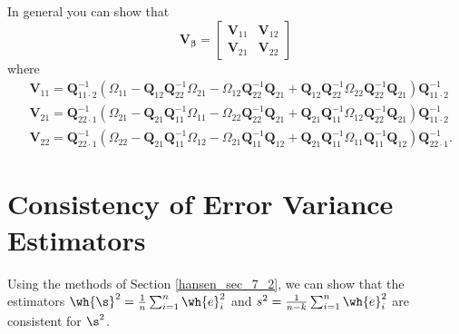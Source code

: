 In general you can show that 
\begin{equation}
    \label{hansen_eq_7_13}
    \boldsymbol{V}_{\boldsymbol{\beta}}=\left[\begin{array}{ll}
    \boldsymbol{V}_{11} & \boldsymbol{V}_{12} \\
    \boldsymbol{V}_{21} & \boldsymbol{V}_{22}
    \end{array}\right]
\end{equation}
where 
\begin{align}
    & \boldsymbol{V}_{11}=\boldsymbol{Q}_{11 \cdot 2}^{-1}\left(\Omega_{11}-\boldsymbol{Q}_{12} \boldsymbol{Q}_{22}^{-1} \Omega_{21}-\Omega_{12} \boldsymbol{Q}_{22}^{-1} \boldsymbol{Q}_{21}+\boldsymbol{Q}_{12} \boldsymbol{Q}_{22}^{-1} \Omega_{22} \boldsymbol{Q}_{22}^{-1} \boldsymbol{Q}_{21}\right) \boldsymbol{Q}_{11 \cdot 2}^{-1} \label{hansen_eq_7_14} \\
    & \boldsymbol{V}_{21}=\boldsymbol{Q}_{22 \cdot 1}^{-1}\left(\Omega_{21}-\boldsymbol{Q}_{21} \boldsymbol{Q}_{11}^{-1} \Omega_{11}-\Omega_{22} \boldsymbol{Q}_{22}^{-1} \boldsymbol{Q}_{21}+\boldsymbol{Q}_{21} \boldsymbol{Q}_{11}^{-1} \Omega_{12} \boldsymbol{Q}_{22}^{-1} \boldsymbol{Q}_{21}\right) \boldsymbol{Q}_{11 \cdot 2}^{-1} \label{hansen_eq_7_15} \\
    & \boldsymbol{V}_{22}=\boldsymbol{Q}_{22 \cdot 1}^{-1}\left(\Omega_{22}-\boldsymbol{Q}_{21} \boldsymbol{Q}_{11}^{-1} \Omega_{12}-\Omega_{21} \boldsymbol{Q}_{11}^{-1} \boldsymbol{Q}_{12}+\boldsymbol{Q}_{21} \boldsymbol{Q}_{11}^{-1} \Omega_{11} \boldsymbol{Q}_{11}^{-1} \boldsymbol{Q}_{12}\right) \boldsymbol{Q}_{22 \cdot 1}^{-1} \label{hansen_eq_7_16}.
\end{align}

\section{Consistency of Error Variance Estimators}
\setcounter{equation}{16}

Using the methods of Section \ref{hansen_sec_7_2}, we can show that the estimators $\wh{\s}^2 = \frac{1}{n}\sum_{i=1}^{n} \wh{e}_i^2$ and $s^2 = \frac{1}{n-k}\sum_{i=1}^{n} \wh{e}_i^2$ are consistent for $\s^2$.


